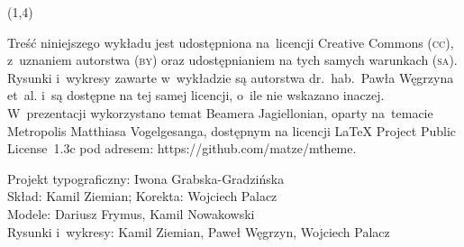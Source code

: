 {\begin{frame}[standout]
\begin{textblock}{4.2}
    \end{textblock}





    \begin{textblock}{11}(1,4)

      \begin{flushleft}

        \mdseries

        \footnotesize

        \RaggedRight

        \color{jFrametitleFGColor}

        Treść niniejszego wykładu jest udostępniona na~licencji
        Creative Commons (\textsc{cc}), z~uzna\-niem autorstwa
        (\textsc{by}) oraz udostępnianiem na tych samych warunkach
        (\textsc{sa}). Rysunki i~wy\-kresy zawarte w~wykładzie są
        autorstwa dr.~hab.~Pawła Węgrzyna et~al. i~są dostępne
        na tej samej licencji, o~ile nie wskazano inaczej.
        W~prezentacji wykorzystano temat Beamera Jagiellonian,
        oparty na~temacie Metropolis Matthiasa Vogelgesanga,
        dostępnym na licencji \LaTeX{} Project Public License~1.3c
        pod adresem: 
        {https://github.com/matze/mtheme}.

        Projekt typograficzny: Iwona Grabska-Gradzińska \\
        Skład: Kamil Ziemian;
        Korekta: Wojciech Palacz \\
        Modele: Dariusz Frymus, Kamil Nowakowski \\
        Rysunki i~wykresy: Kamil Ziemian, Paweł Węgrzyn, Wojciech Palacz

      \end{flushleft}

    \end{textblock}

  \end{frame}
}




